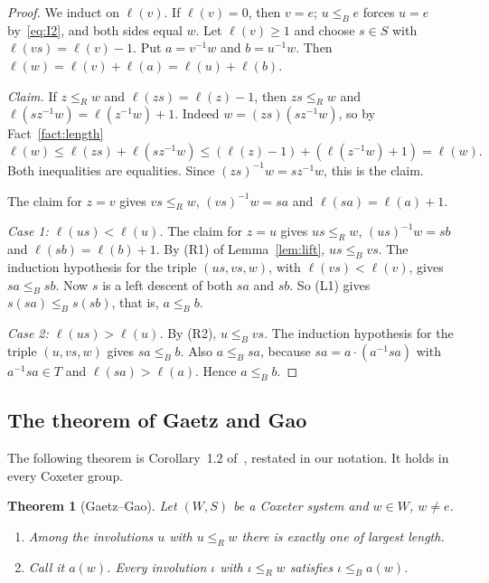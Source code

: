 \documentclass[11pt]{amsart}
\newtheorem{theorem}{Theorem}[section]
\theoremstyle{definition}
\theoremstyle{remark}
\numberwithin{equation}{section}
\newcommand{\leR}{\le_R}
\newcommand{\leB}{\le_B}
\begin{document}
\begin{proof}
We induct on \(\ell(v)\). If \(\ell(v)=0\), then \(v=e\); \(u\leB e\) forces \(u=e\) by~\eqref{eq:I2}, and both sides equal \(w\). Let \(\ell(v)\ge1\) and choose \(s\in S\) with \(\ell(vs)=\ell(v)-1\). Put \(a=v^{-1}w\) and \(b=u^{-1}w\). Then \(\ell(w)=\ell(v)+\ell(a)=\ell(u)+\ell(b)\).

\emph{Claim.} If \(z\leR w\) and \(\ell(zs)=\ell(z)-1\), then \(zs\leR w\) and \(\ell(sz^{-1}w)=\ell(z^{-1}w)+1\). Indeed \(w=(zs)(sz^{-1}w)\), so by Fact~\ref{fact:length}
\[
\ell(w)\le\ell(zs)+\ell(sz^{-1}w)\le(\ell(z)-1)+(\ell(z^{-1}w)+1)=\ell(w).
\]
Both inequalities are equalities. Since \((zs)^{-1}w=sz^{-1}w\), this is the claim.

The claim for \(z=v\) gives \(vs\leR w\), \((vs)^{-1}w=sa\) and \(\ell(sa)=\ell(a)+1\).

\emph{Case 1: \(\ell(us)<\ell(u)\).} The claim for \(z=u\) gives \(us\leR w\), \((us)^{-1}w=sb\) and \(\ell(sb)=\ell(b)+1\). By (R1) of Lemma~\ref{lem:lift}, \(us\leB vs\). The induction hypothesis for the triple \((us,vs,w)\), with \(\ell(vs)<\ell(v)\), gives \(sa\leB sb\). Now \(s\) is a left descent of both \(sa\) and \(sb\). So (L1) gives \(s(sa)\leB s(sb)\), that is, \(a\leB b\).

\emph{Case 2: \(\ell(us)>\ell(u)\).} By (R2), \(u\leB vs\). The induction hypothesis for the triple \((u,vs,w)\) gives \(sa\leB b\). Also \(a\leB sa\), because \(sa=a\cdot(a^{-1}sa)\) with \(a^{-1}sa\in T\) and \(\ell(sa)>\ell(a)\). Hence \(a\leB b\).
\end{proof}

\subsection{The theorem of Gaetz and Gao}
The following theorem is Corollary~1.2 of~\cite{GG}, restated in our notation. It holds in every Coxeter group.

\begin{theorem}[Gaetz--Gao]\label{thm:GG}
Let \((W,S)\) be a Coxeter system and \(w\in W\), \(w\neq e\).
\begin{enumerate}
\item Among the involutions \(u\) with \(u\leR w\) there is exactly one of largest length.
\item Call it \(a(w)\). Every involution \(\iota\) with \(\iota\leR w\) satisfies \(\iota\leB a(w)\).
\end{enumerate}
\end{theorem}
\end{document}
